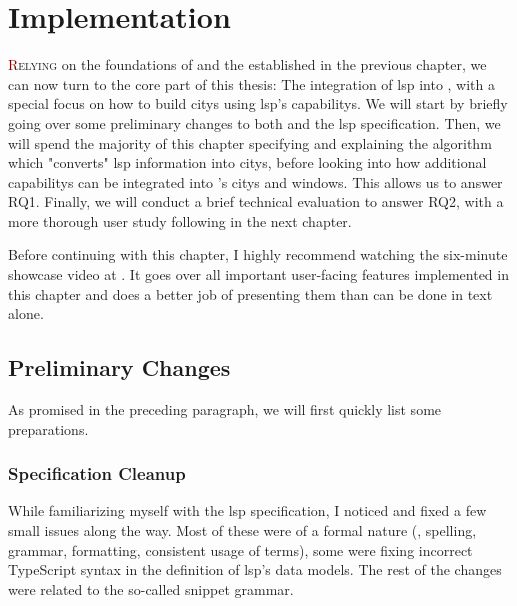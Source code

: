 \documentclass[../thesis]{subfiles}
\begin{document}
\chapter{Implementation}\label{ch:implementation}

\lettrine[lines=3]{\textcolor{Maroon}{R}}{elying} on the foundations of \SEE{} and the  established in the previous chapter, we can now turn to the core part of this thesis:
The integration of \gls{lsp} into \SEE{}, with a special focus on how to build \glspl{city} using \gls{lsp}'s \glspl{capability}.
We will start by briefly going over some preliminary changes to both \SEE{} and the \gls{lsp} specification.
Then, we will spend the majority of this chapter specifying and explaining the algorithm which "converts" \gls{lsp} information into \glspl{city}, before looking into how additional \glspl{capability} can be integrated into \SEE{}'s \glspl{city} and \glspl{window}.
This allows us to answer \textsf{RQ1}.
Finally, we will conduct a brief technical evaluation to answer \textsf{RQ2}, with a more thorough user study following in the next chapter.

Before continuing with this chapter, I highly recommend watching the six-minute showcase video at .
It goes over all important user-facing features implemented in this chapter and does a better job of presenting them than can be done in text alone.

\section{Preliminary Changes}
As promised in the preceding paragraph, we will first quickly list some preparations.

\subsection{Specification Cleanup}
While familiarizing myself with the \gls{lsp} specification, I noticed and fixed a few small issues along the way.
Most of these were of a formal nature (\eg, spelling, grammar, formatting, consistent usage of terms), some were fixing incorrect TypeScript syntax in the definition of \gls{lsp}'s data models.
The rest of the changes were related to the so-called snippet grammar.
\end{document}
